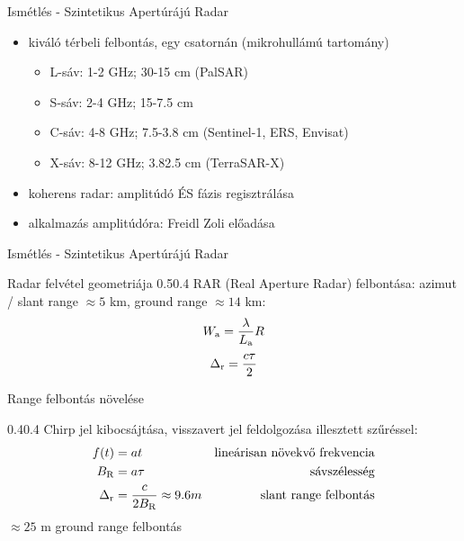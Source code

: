 \def\ft{Ismétlés - Szintetikus Apertúrájú Radar}

\begin{frame}{\ft}
    \begin{itemize}
        \item kiváló térbeli felbontás, egy csatornán (mikrohullámú tartomány)
        \begin{itemize}
            \item L-sáv: 1-2 GHz; 30-15 cm (PalSAR)
            \item S-sáv: 2-4 GHz; 15-7.5 cm
            \item C-sáv: 4-8 GHz; 7.5-3.8 cm (Sentinel-1, ERS, Envisat)
            \item X-sáv: 8-12 GHz; 3.82.5 cm (TerraSAR-X)
        \end{itemize}
        \item koherens radar: amplitúdó ÉS fázis regisztrálása
        \item alkalmazás amplitúdóra: Freidl Zoli előadása
    \end{itemize}
\end{frame}


\begin{frame}{\ft}
    \begin{figp}{}{Radar felvétel geometriája \cite{RamonHanssen}}{0.5}{0.4}
        RAR (Real Aperture Radar) felbontása: azimut / slant range $\approx 5$ km, ground range $\approx 14$ km:
        $$ W_{\text{a}} = \frac{\lambda}{L_{\text{a}}} R $$
        $$ \Delta_{\text{r}} = \frac{c\tau}{2} $$
    \end{figp}
\end{frame}

\def\ft{Range felbontás növelése}

\begin{frame}{\ft}
    \begin{figp}{}{}{0.4}{0.4}
        Chirp jel kibocsájtása, visszavert jel feldolgozása illesztett szűréssel:
        \begin{align*}
            f(t) &= a t & \text{lineárisan növekvő frekvencia} \\
            B_{\text{R}} &= a \tau & \text{sávszélesség} \\
            \Delta_{\text{r}} &= \frac{c}{2 B_{\text{R}}} \approx 9.6 m & \text{slant range felbontás}
        \end{align*}
        $\approx 25$ m ground range felbontás
    \end{figp}
\end{frame}

